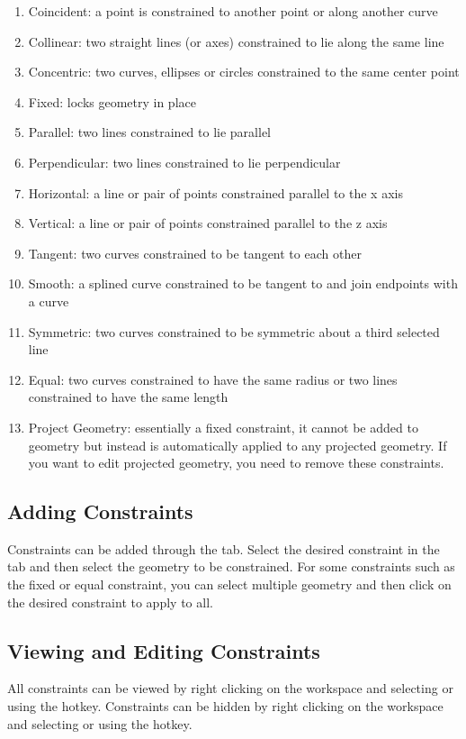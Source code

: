 \begin{enumerate}
\item Coincident: a point is constrained to another point or along another curve
\item Collinear: two straight lines (or axes) constrained to lie along the same line
\item Concentric: two curves, ellipses or circles constrained to the same center point
\item Fixed: locks geometry in place
\item Parallel: two lines constrained to lie parallel
\item Perpendicular: two lines constrained to lie perpendicular
\item Horizontal: a line or pair of points constrained parallel to the x axis
\item Vertical: a line or pair of points constrained parallel to the z axis
\item Tangent: two curves constrained to be tangent to each other
\item Smooth: a splined curve constrained to be tangent to and join endpoints with a curve
\item Symmetric: two curves constrained to be symmetric about a third selected line
\item Equal: two curves constrained to have the same radius or two lines constrained to have the same length
\item Project Geometry: essentially a fixed constraint, it cannot be added to geometry but instead is automatically applied to any projected geometry. If you want to edit projected geometry, you need to remove these constraints.
\end{enumerate}

\subsection{Adding Constraints}
Constraints can be added through the  tab. Select the desired constraint in the tab and then select the geometry to be constrained. For some constraints such as the fixed or equal constraint, you can select multiple geometry and then click on the desired constraint to apply to all.

\subsection{Viewing and Editing Constraints}
All constraints can be viewed by right clicking on the workspace and selecting  or using the  hotkey. Constraints can be hidden by right clicking on the workspace and selecting  or using the  hotkey.

